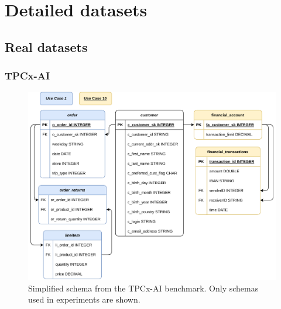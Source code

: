 \chapter{Detailed datasets}


\section{Real datasets}
\subsection{TPCx-AI}

\begin{figure}[ht]
    \centering
    \includegraphics[width=0.99\linewidth]{appendices/figures/tpc-ai-schema.pdf}
    \caption[Simplified schema from the TPCx-AI\cite{tpcx-ai} benchmark]{Simplified schema from the TPCx-AI\cite{tpcx-ai} benchmark. Only schemas used in experiments are shown.}
    \label{fig:appendix-tpc-ai-schema}
\end{figure}